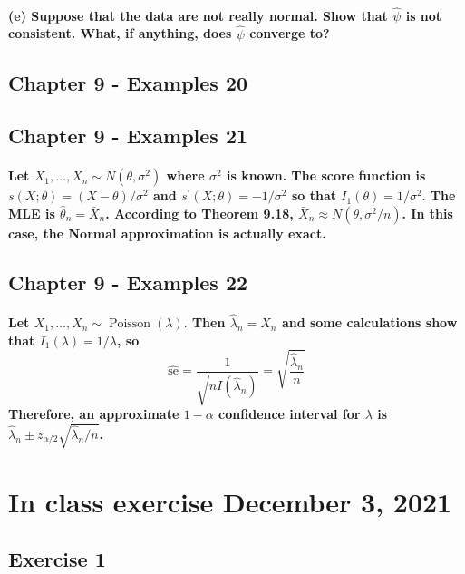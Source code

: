 \documentclass{article}
\begin{document}
\paragraph{(e) Suppose that the data are not really normal. Show that $\widehat{\psi}$ is not consistent. What, if anything, does $\widehat{\psi}$ converge to?}

\subsection{Chapter 9 - Examples 20}
\subsection{Chapter 9 - Examples 21}
\paragraph{Let $X_{1}, \ldots, X_{n} \sim N\left(\theta, \sigma^{2}\right)$ where $\sigma^{2}$ is known. The score function is $s(X ; \theta)=(X-\theta) / \sigma^{2}$ and $s^{\prime}(X ; \theta)=-1 / \sigma^{2}$ so that $I_{1}(\theta)=1 / \sigma^{2} .$ The MLE is $\widehat{\theta}_{n}=\bar{X}_{n}$. According to Theorem 9.18, $\bar{X}_{n} \approx N\left(\theta, \sigma^{2} / n\right)$. In this case, the Normal approximation is actually exact.}

\subsection{Chapter 9 - Examples 22}
\paragraph{Let $X_{1}, \ldots, X_{n} \sim \operatorname{Poisson}(\lambda) .$ Then $\widehat{\lambda}_{n}=\bar{X}_{n}$ and some calculations show that $I_{1}(\lambda)=1 / \lambda$, so
    $$
        \widehat{\mathrm{se}}=\frac{1}{\sqrt{n I\left(\widehat{\lambda}_{n}\right)}}=\sqrt{\frac{\widehat{\lambda}_{n}}{n}}
    $$
    Therefore, an approximate $1-\alpha$ confidence interval for $\lambda$ is $\widehat{\lambda}_{n} \pm z_{\alpha / 2} \sqrt{\widehat{\lambda}_{n} / n}$.}

\section{In class exercise December 3, 2021}
\subsection{Exercise 1}
\end{document}
